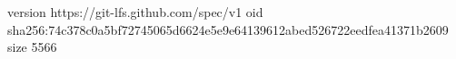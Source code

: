 version https://git-lfs.github.com/spec/v1
oid sha256:74c378c0a5bf72745065d6624e5e9e64139612abed526722eedfea41371b2609
size 5566
